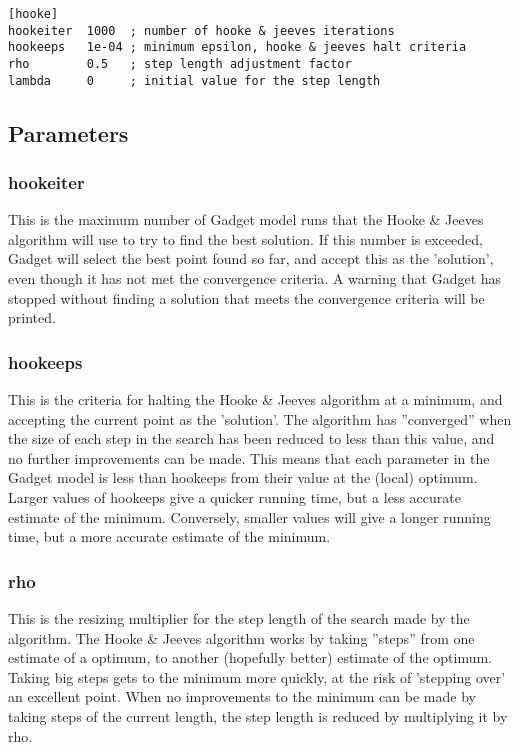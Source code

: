 \documentclass[10pt,twoside]{book}
\begin{document}
{\small\begin{verbatim}
[hooke]
hookeiter  1000  ; number of hooke & jeeves iterations
hookeeps   1e-04 ; minimum epsilon, hooke & jeeves halt criteria
rho        0.5   ; step length adjustment factor
lambda     0     ; initial value for the step length
\end{verbatim}}

\subsection{Parameters}\label{subsec:hookepar}
\subsubsection{hookeiter}
This is the maximum number of Gadget model runs that the Hooke \& Jeeves algorithm will use to try to find the best solution.  If this number is exceeded, Gadget will select the best point found so far, and accept this as the 'solution', even though it has not met the convergence criteria.  A warning that Gadget has stopped without finding a solution that meets the convergence criteria will be printed.

\subsubsection{hookeeps}
This is the criteria for halting the Hooke \& Jeeves algorithm at a minimum, and accepting the current point as the 'solution'.  The algorithm has ''converged'' when the size of each step in the search has been reduced to less than this value, and no further improvements can be made.  This means that each parameter in the Gadget model is less than hookeeps from their value at the (local) optimum.  Larger values of hookeeps give a quicker running time, but a less accurate estimate of the minimum.  Conversely, smaller values will give a longer running time, but a more accurate estimate of the minimum.

\subsubsection{rho}
This is the resizing multiplier for the step length of the search made by the algorithm.  The Hooke \& Jeeves algorithm works by taking ''steps'' from one estimate of a optimum, to another (hopefully better) estimate of the optimum.  Taking big steps gets to the minimum more quickly, at the risk of 'stepping over' an excellent point.  When no improvements to the minimum can be made by taking steps of the current length, the step length is reduced by multiplying it by rho.
\end{document}
